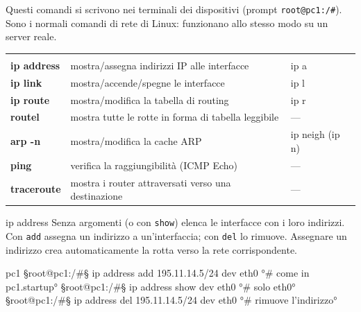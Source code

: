 
Questi comandi si scrivono nei terminali dei dispositivi (prompt \texttt{root@pc1:/\#}). Sono i normali comandi di rete di Linux: funzionano allo stesso modo su un server reale.

\begin{center}
\begin{tabularx}{\linewidth}{>{\ttfamily\bfseries\color{navy}}l Y >{\ttfamily\small}l}
 &  & \\
ip address & mostra/assegna indirizzi IP alle interfacce & ip a\\
ip link & mostra/accende/spegne le interfacce & ip l\\
ip route & mostra/modifica la tabella di routing & ip r\\
routel & mostra tutte le rotte in forma di tabella leggibile & —\\
arp -n & mostra/modifica la cache ARP & ip neigh (ip n)\\
ping & verifica la raggiungibilità (ICMP Echo) & —\\
traceroute & mostra i router attraversati verso una destinazione & —\\
\end{tabularx}
\end{center}

\begin{scheda}{ip address}
 \quad {} \quad {}
Senza argomenti (o con \texttt{show}) elenca le interfacce con i loro indirizzi. Con \texttt{add} assegna un indirizzo a un'interfaccia; con \texttt{del} lo rimuove. Assegnare un indirizzo crea automaticamente la rotta verso la rete corrispondente.
\begin{terminale}{pc1}
§root@pc1:/#§ ip address add 195.11.14.5/24 dev eth0    °# come in pc1.startup°
§root@pc1:/#§ ip address show dev eth0                  °# solo eth0°
§root@pc1:/#§ ip address del 195.11.14.5/24 dev eth0    °# rimuove l'indirizzo°
\end{terminale}
\end{scheda}

